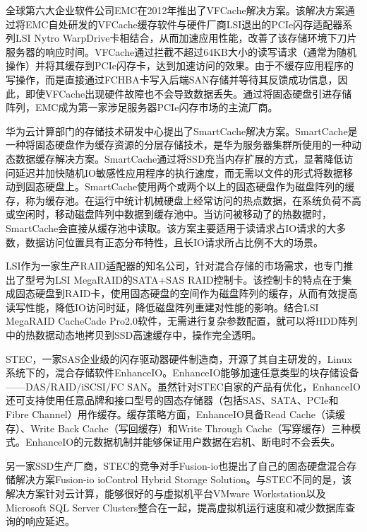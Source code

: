 全球第六大企业软件公司EMC在2012年推出了VFCache解决方案\cite{vfcache}。该解决方案通过将EMC自处研发的VFCache缓存软件与硬件厂商LSI退出的PCIe闪存适配器系列LSI Nytro WarpDrive卡相结合，从而加速应用性能，改善了该存储环境下刀片服务器的响应时间。VFCache通过拦截不超过64KB大小的读写请求（通常为随机操作）并将其缓存到PCIe闪存卡，达到加速访问的效果。由于不缓存应用程序的写操作，而是直接通过FCHBA卡写入后端SAN存储并等待其反馈成功信息，因此，即使VFCache出现硬件故障也不会导致数据丢失。通过将固态硬盘引进存储阵列，EMC成为第一家涉足服务器PCIe闪存市场的主流厂商。

华为云计算部门的存储技术研发中心提出了SmartCache解决方案\cite{smartcache}。SmartCache是一种将固态硬盘作为缓存资源的分层存储技术，是华为服务器集群所使用的一种动态数据缓存解决方案。SmartCache通过将SSD充当内存扩展的方式，显著降低访问延迟并加快随机IO敏感性应用程序的执行速度，而无需以文件的形式将数据移动到固态硬盘上。SmartCache使用两个或两个以上的固态硬盘作为磁盘阵列的缓存，称为缓存池。在运行中统计机械硬盘上经常访问的热点数据，在系统负荷不高或空闲时，移动磁盘阵列中数据到缓存池中。当访问被移动了的热数据时，SmartCache会直接从缓存池中读取。该方案主要适用于读请求占IO请求的大多数，数据访问位置具有正态分布特性，且长IO请求所占比例不大的场景。

LSI作为一家生产RAID适配器的知名公司，针对混合存储的市场需求，也专门推出了型号为LSI MegaRAID的SATA+SAS RAID控制卡。该控制卡的特点在于集成固态硬盘到RAID卡，使用固态硬盘的空间作为磁盘阵列的缓存，从而有效提高读写性能，降低IO访问时延，降低磁盘阵列重建对性能的影响。结合LSI MegaRAID CacheCade Pro2.0软件\cite{lsiraidcache}，无需进行复杂参数配置，就可以将HDD阵列中的热数据动态地拷贝到SSD高速缓存中，操作完全透明。

STEC，一家SAS企业级的闪存驱动器硬件制造商，开源了其自主研发的，Linux系统下的，混合存储软件EnhanceIO\cite{enhanceio}。EnhanceIO能够加速任意类型的块存储设备——DAS/RAID/iSCSI/FC SAN。虽然针对STEC自家的产品有优化，EnhanceIO还可支持使用任意品牌和接口型号的固态存储器（包括SAS、SATA、PCIe和Fibre Channel）用作缓存。缓存策略方面，EnhanceIO具备Read Cache（读缓存）、Write Back Cache（写回缓存）和Write Through Cache（写穿缓存）三种模式。EnhanceIO的元数据机制并能够保证用户数据在宕机、断电时不会丢失。

另一家SSD生产厂商，STEC的竞争对手Fusion-io也提出了自己的固态硬盘混合存储解决方案Fusion-io ioControl Hybrid Storage Solution\cite{fusionio}。与STEC不同的是，该解决方案针对云计算，能够很好的与虚拟机平台VMware Workstation以及Microsoft SQL Server Clusters整合在一起，提高虚拟机运行速度和减少数据库查询的响应延迟。

